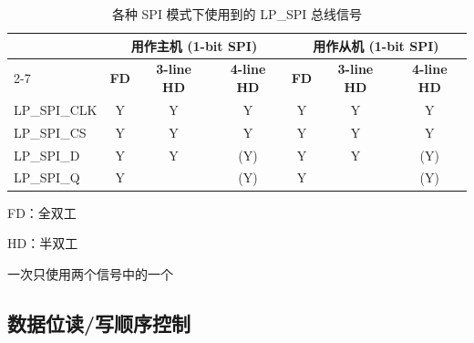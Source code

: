 \documentclass[main\_\_CN.tex]{subfiles}
\begin{document}
\begin{table}[H]
    \centering
    \caption{各种 SPI 模式下使用到的 LP\_SPI 总线信号}
    \label{tab:lpspi-bus-singals-used-in-various-spi-modes}

    \begin{threeparttable}
    \begin{tabular}{ |p{3.0cm} |c|c|c|c|c|c| }
    \hline
        \rowcolor{lightgray}
        & \multicolumn{3}{c|}{\textbf{用作主机 (1-bit SPI)}} & \multicolumn{3}{c|}{\textbf{用作从机 (1-bit SPI)}} \\\cline{2-7}
        \rowcolor{lightgray}
        \rowcolor{lightgray}
        \multirow{-2}{*}{\textbf{LP\_SPI 总线信号}} & \textbf{FD\tnote{1}} & \textbf{3-line HD\tnote{2}} & \textbf{4-line HD} & \textbf{FD} & \textbf{3-line HD} & \textbf{4-line HD}  \\ \hline
LP\_SPI\_CLK                & Y       & Y       & Y      & Y       & Y      & Y        \\ \hline
LP\_SPI\_CS                   & Y       & Y       & Y      & Y       & Y      & Y        \\ \hline
LP\_SPI\_D                    & Y       & Y       & (Y)\tnote{3}       & Y       & Y      & (Y)\tnote{3}    \\ \hline
LP\_SPI\_Q                  & Y       &         & (Y)\tnote{3}       & Y       &        & (Y)\tnote{3}      \\ \hline


\end{tabular}
        \begin{tablenotes}
                \item[1] FD：全双工
                \item[2] HD：半双工
                \item[3] 一次只使用两个信号中的一个
        \end{tablenotes}
     \end{threeparttable}
    \end{table}    

\subsection{数据位读/写顺序控制}
\end{document}
